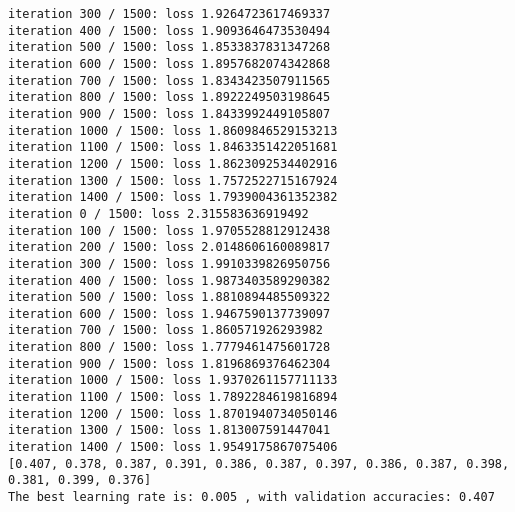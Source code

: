 \documentclass[11pt]{article}
\begin{document}
\begin{Verbatim}[commandchars=\\\{\}]
iteration 300 / 1500: loss 1.9264723617469337
iteration 400 / 1500: loss 1.9093646473530494
iteration 500 / 1500: loss 1.8533837831347268
iteration 600 / 1500: loss 1.8957682074342868
iteration 700 / 1500: loss 1.8343423507911565
iteration 800 / 1500: loss 1.8922249503198645
iteration 900 / 1500: loss 1.8433992449105807
iteration 1000 / 1500: loss 1.8609846529153213
iteration 1100 / 1500: loss 1.8463351422051681
iteration 1200 / 1500: loss 1.8623092534402916
iteration 1300 / 1500: loss 1.7572522715167924
iteration 1400 / 1500: loss 1.7939004361352382
iteration 0 / 1500: loss 2.315583636919492
iteration 100 / 1500: loss 1.9705528812912438
iteration 200 / 1500: loss 2.0148606160089817
iteration 300 / 1500: loss 1.9910339826950756
iteration 400 / 1500: loss 1.9873403589290382
iteration 500 / 1500: loss 1.8810894485509322
iteration 600 / 1500: loss 1.9467590137739097
iteration 700 / 1500: loss 1.860571926293982
iteration 800 / 1500: loss 1.7779461475601728
iteration 900 / 1500: loss 1.8196869376462304
iteration 1000 / 1500: loss 1.9370261157711133
iteration 1100 / 1500: loss 1.7892284619816894
iteration 1200 / 1500: loss 1.8701940734050146
iteration 1300 / 1500: loss 1.813007591447041
iteration 1400 / 1500: loss 1.9549175867075406
[0.407, 0.378, 0.387, 0.391, 0.386, 0.387, 0.397, 0.386, 0.387, 0.398, 0.381, 0.399, 0.376]
The best learning rate is: 0.005 , with validation accuracies: 0.407

    \end{Verbatim}


    
    
    
    
\end{document}
